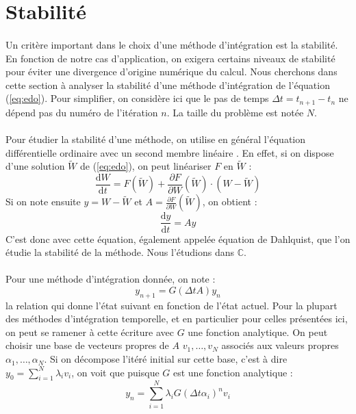   \section{Stabilité}

    \paragraph{}
    Un critère important dans le choix d'une méthode d'intégration est la stabilité.
    En fonction de notre cas d'application, on exigera certains niveaux de stabilité pour éviter une divergence d'origine numérique du calcul.
    Nous cherchons dans cette section à analyser la stabilité d'une méthode d'intégration de l'équation (\ref{eq:edo}).
    Pour simplifier, on considère ici que le pas de temps $\Delta t = t_{n+1} - t_n$ ne dépend pas du numéro de l'itération $n$.
    La taille du problème est notée $N$.

    \paragraph{}
    Pour étudier la stabilité d'une méthode, on utilise en général l'équation différentielle ordinaire avec un second membre linéaire \cite{HairerWanner1996}.
    En effet, si on dispose d'une solution $\tilde{W}$ de (\ref{eq:edo}), on peut linéariser $F$ en $\tilde{W}$ :
    $$\frac{\mathrm{d}W}{\mathrm{d}t} = F\left(\tilde{W}\right) + \frac{\partial F}{\partial W}\left(\tilde{W}\right)\cdot\left(W - \tilde{W}\right)$$
    Si on note ensuite $y = W - \tilde{W}$ et $A = \frac{\partial F}{\partial W}\left(\tilde{W}\right)$, on obtient :
    \begin{equation}\label{eq:stab}
      \frac{\mathrm{d}y}{\mathrm{d}t} = Ay
    \end{equation}
    C'est donc avec cette équation, également appelée équation de Dahlquist, que l'on étudie la stabilité de la méthode.
    Nous l'étudions dans $\mathbb{C}$.

    \paragraph{}
    Pour une méthode d'intégration donnée, on note :
    \begin{equation}\label{eq:stab_req}
      y_{n+1} = G\left(\Delta tA\right)y_n
    \end{equation}
    la relation qui donne l'état suivant en fonction de l'état actuel.
    Pour la plupart des méthodes d'intégration temporelle, et en particulier pour celles présentées ici, on peut se ramener à cette écriture avec $G$ une fonction analytique.
    On peut choisir une base de vecteurs propres de $A$ $v_1, \dots, v_N$ associés aux valeurs propres $\alpha_1, \dots, \alpha_N$.
    Si on décompose l'itéré initial sur cette base, c'est à dire $y_0 = \sum_{i=1}^N\lambda_iv_i$, on voit que puisque $G$ est une fonction analytique :
    $$y_n = \sum_{i=1}^N\lambda_iG\left(\Delta t\alpha_i\right)^nv_i$$

